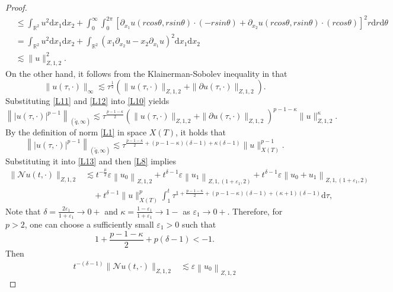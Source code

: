 \documentclass[11pt,twoside]{article}
\newcommand{\p}{\partial}
\newcommand{\ve}{\varepsilon}
\newcommand{\f}{\frac}
\theoremstyle{plain}
\theoremstyle{definition}
\theoremstyle{remark}
\numberwithin{equation}{section}
\begin{document}
\begin{proof}
\begin{equation}
\begin{aligned}
& \leq \int_{\mathbb{R}^2} u^2 \mathrm{d}x_1 \mathrm{d}x_2  +\int_0^{\infty}\int_0^{2 \pi}[\p_ {x_1} u(rcos\theta, rsin\theta) \cdot(-rsin\theta) +\p_{x_2} u(rcos\theta,rsin\theta)\cdot(rcos\theta)]^2r \mathrm{d} r \mathrm{d}\theta \\
& =\int_{\mathbb{R}^2} u^2 \mathrm{d} x_1 \mathrm{d} x_2  +\int_{\mathbb{R}^2}(x_1\p_{x_2}u-x_2\p_{x_1}u)^2\mathrm{d} x_1 \mathrm{d} x_2 \\
& \lesssim \|u\|_{Z, 1, 2}^2.
\end{aligned}
\end{equation}
On the other hand, it follows from the Klainerman-Sobolev inequality in \cite{KS} that
\begin{equation}\label{L12}
\|u(\tau, \cdot)\|_{\infty} \lesssim \tau^{\frac{1}{2}}\left(\|u(\tau, \cdot)\|_{Z, 1,2}+\|\p u(\tau, \cdot)\|_{Z, 1,2}\right).
\end{equation}
Substituting \eqref{L11} and \eqref{L12} into \eqref{L10} yields
$$
\left\||u(\tau, \cdot)|^{p-1}\right\|_{(\tilde{q}, \infty)} \lesssim
\tau^{\frac{p-1-\kappa}{2}}\left(\|u(\tau, \cdot)\|_{Z, 1,2}+\|\p  u(\tau, \cdot)\|_{Z, 1,2}\right)^{p-1-\kappa}\|u\|_{Z, 1, 2}^\kappa.
$$
By the definition of norm \eqref{L1} in space $X(T)$, it holds that
$$
\left\||u(\tau, \cdot)|^{p-1}\right\|_{(\tilde{q}, \infty)}\lesssim \tau^{\frac{p-1-\kappa}{2}+(p-1-\kappa)(\delta-1)+\kappa(\delta-1)}\|u\|_{X(T)}^{p-1}.
$$
Substituting it into \eqref{L13} and then \eqref{L8} implies
\begin{equation}\label{L14}
\begin{aligned}
\|\mathcal{N} u(t, \cdot)\|_{Z, 1, 2} &\lesssim t^{-\f{\mu}{2}}\ve\left\|u_0\right\|_{Z, 1, 2}
+t^{\delta-1}\ve\left\|u_1\right\|_{Z, 1,(1+\varepsilon_1, 2)}
+t^{\delta-1}\ve\left\|u_0+u_1\right\|_{Z, 1,(1+\varepsilon_1, 2)}\\
&\quad+ t^{\delta-1}\|u\|_{X(T)}^p\int_{1}^{t} \tau^{1+\frac{p-1-\kappa}{2}+(p-1-\kappa)(\delta-1)
+(\kappa+1)(\delta-1)}\mathrm{d}\tau,
\end{aligned}
\end{equation}
Note that $\delta=\f{2\varepsilon_1}{1+\varepsilon_1}\rightarrow 0+$ and $\kappa=\f{1-\varepsilon_1}{1+\varepsilon_1}\rightarrow 1-$ as $\varepsilon_1\rightarrow0+$. Therefore, for $p>2$, one can choose a sufficiently small $\varepsilon_1>0$ such that
$$
1+\frac{p-1-\kappa}{2}+p(\delta-1)<-1.
$$
Then
\begin{equation}\label{L15}
\begin{aligned}
t^{-(\delta-1)}\|\mathcal{N} u(t, \cdot)\|_{Z, 1, 2} &\lesssim \ve\left\|u_0\right\|_{Z, 1, 2}

\end{aligned}
\end{equation}
\end{proof}
\end{document}
